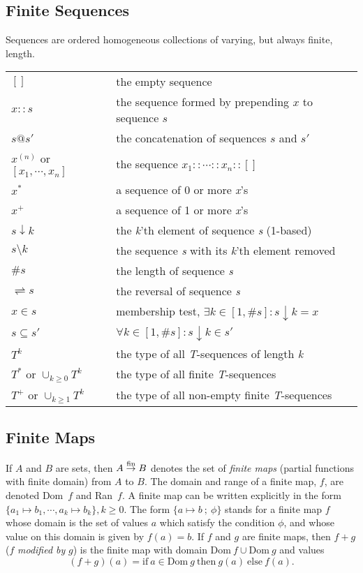 \subsection{Finite Sequences}
Sequences are ordered homogeneous collections of varying, but always finite, length.
\smallskip\par\noindent\begin{tabular}{@{}l@{~}l}
$[]$ & the empty sequence\\
$x::s$ & the sequence formed by prepending $x$ to sequence $s$\\
$s@s'$ & the concatenation of sequences $s$ and $s'$\\
$x^{(n)}$ or $[x_1,\cdots,x_n]$ & the sequence $x_1::\cdots ::x_n::[]$\\
$x^*$ & a sequence of 0 or more \emph{x}'s\\
$x^+$ & a sequence of 1 or more \emph{x}'s\\
$s\downarrow k$ & the \emph{k}'th element of sequence \emph{s} (1-based)\\
$s\setminus k$ & the sequence \emph{s} with its \emph{k}'th element removed\\
$\#s$ & the length of sequence \emph{s}\\
$\rightleftharpoons s$ & the reversal of sequence \emph{s}\\
$x\in s$ & membership test, $\exists k\in[1,\#s] : s\downarrow k = x$\\
$s\subseteq s'$ & $\forall k\in[1,\#s] : s\downarrow k \in s'$\\
$T^k$ & the type of all \emph{T}-sequences of length \emph{k}\\
$T^*$ or $\cup_{k\geq 0}T^k$ & the type of all finite \emph{T}-sequences\\
$T^+$ or $\cup_{k\geq 1}T^k$ & the type of all non-empty finite \emph{T}-sequences
\end{tabular}
%
\subsection{Finite Maps}
If $A$ and $B$ are sets, then $A \stackrel{\mathrm{fin}}{\rightarrow} B$ denotes the set
of \emph{finite maps} (partial functions with finite domain) from $A$ to $B$.
The domain and range of a finite map, $f$, are denoted Dom~$f$ and Ran~$f$.
A finite map can be written explicitly in the form
$\{a_1\mapsto b_1,\cdots,a_k\mapsto b_k\}, k\geq 0$.
The form $\{a\mapsto b ~;~ \phi\}$ stands for a finite map $f$ whose domain
is the set of values $a$ which satisfy the condition $\phi$,
and whose value on this domain is given by $f(a)=b$.
If $f$ and $g$ are finite maps, then $f + g$ ($f$ \emph{modified by} $g$)
is the finite map with domain $\mathrm{Dom}~f\cup\mathrm{Dom}~g$ and values
\[ (f + g)(a) = \mathrm{if}~a\in\mathrm{Dom}~g~\mathrm{then}~g(a)~\mathrm{else}~f(a). \]
%
